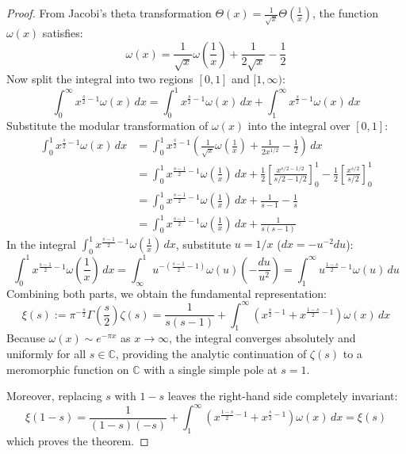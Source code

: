 \documentclass[a4paper]{article}
\begin{document}
\begin{proof}
From Jacobi's theta transformation $\Theta(x) = \frac{1}{\sqrt{x}} \Theta\left(\frac{1}{x}\right)$, the function $\omega(x)$ satisfies:
\[
    \omega(x) = \frac{1}{\sqrt{x}} \omega\left(\frac{1}{x}\right) + \frac{1}{2\sqrt{x}} - \frac{1}{2}
\]
Now split the integral into two regions $[0, 1]$ and $[1, \infty)$:
\[
    \int_0^{\infty} x^{\frac{s}{2}-1} \omega(x) \, dx = \int_0^1 x^{\frac{s}{2}-1} \omega(x) \, dx + \int_1^{\infty} x^{\frac{s}{2}-1} \omega(x) \, dx
\]
Substitute the modular transformation of $\omega(x)$ into the integral over $[0, 1]$:
\begin{align*}
    \int_0^1 x^{\frac{s}{2}-1} \omega(x) \, dx &= \int_0^1 x^{\frac{s}{2}-1} \left( \frac{1}{\sqrt{x}} \omega\left(\frac{1}{x}\right) + \frac{1}{2 x^{1/2}} - \frac{1}{2} \right) \, dx \\
    &= \int_0^1 x^{\frac{s-1}{2}-1} \omega\left(\frac{1}{x}\right) \, dx + \frac{1}{2} \left[ \frac{x^{s/2 - 1/2}}{s/2 - 1/2} \right]_0^1 - \frac{1}{2} \left[ \frac{x^{s/2}}{s/2} \right]_0^1 \\
    &= \int_0^1 x^{\frac{s-1}{2}-1} \omega\left(\frac{1}{x}\right) \, dx + \frac{1}{s-1} - \frac{1}{s} \\
    &= \int_0^1 x^{\frac{s-1}{2}-1} \omega\left(\frac{1}{x}\right) \, dx + \frac{1}{s(s-1)}
\end{align*}
In the integral $\int_0^1 x^{\frac{s-1}{2}-1} \omega\left(\frac{1}{x}\right) \, dx$, substitute $u = 1/x$ ($dx = -u^{-2} du$):
\[
    \int_0^1 x^{\frac{s-1}{2}-1} \omega\left(\frac{1}{x}\right) \, dx = \int_{\infty}^1 u^{-\left(\frac{s-1}{2}-1\right)} \omega(u) \left(-\frac{du}{u^2}\right) = \int_1^{\infty} u^{\frac{1-s}{2}-1} \omega(u) \, du
\]
Combining both parts, we obtain the fundamental representation:
\begin{equation}
    \xi(s) := \pi^{-\frac{s}{2}} \Gamma\left(\frac{s}{2}\right) \zeta(s) = \frac{1}{s(s-1)} + \int_1^{\infty} \left( x^{\frac{s}{2}-1} + x^{\frac{1-s}{2}-1} \right) \omega(x) \, dx
\end{equation}
Because $\omega(x) \sim e^{-\pi x}$ as $x \to \infty$, the integral converges absolutely and uniformly for all $s \in \mathbb{C}$, providing the analytic continuation of $\zeta(s)$ to a meromorphic function on $\mathbb{C}$ with a single simple pole at $s=1$. 

Moreover, replacing $s$ with $1-s$ leaves the right-hand side completely invariant:
\[
    \xi(1-s) = \frac{1}{(1-s)(-s)} + \int_1^{\infty} \left( x^{\frac{1-s}{2}-1} + x^{\frac{s}{2}-1} \right) \omega(x) \, dx = \xi(s)
\]
which proves the theorem.
\end{proof}
\end{document}
